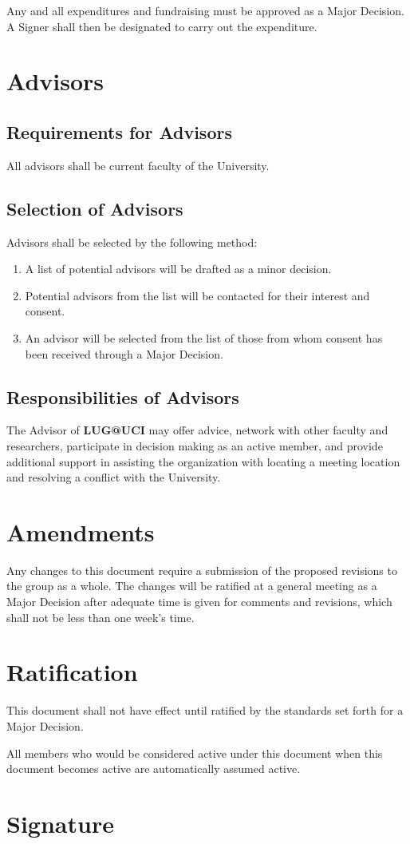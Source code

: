 \documentclass{article}
\begin{document}
Any and all expenditures and fundraising must be approved as a Major Decision. A 
Signer shall then be designated to carry out the expenditure.

\section{Advisors}

\subsection{Requirements for Advisors}

All advisors shall be current faculty of the University.

\subsection{Selection of Advisors}

Advisors shall be selected by the following method:

\begin{enumerate}

    \item A list of potential advisors will be drafted as a minor decision.
    \item Potential advisors from the list will be contacted for their
        interest and consent.
    \item An advisor will be selected from the list of those from whom
        consent has been received through a Major Decision.

\end{enumerate}

\subsection{Responsibilities of Advisors}

The Advisor of \textbf{LUG@UCI} may offer advice, network with other faculty and
researchers, participate in decision making as an active member, and provide
additional support in assisting the organization with locating a meeting location
and resolving a conflict with the University.

\section{Amendments}

Any changes to this document require a submission of the proposed revisions to the
group as a whole. The changes will be ratified at a general meeting as a Major Decision
after adequate time is given for comments and revisions, which shall not be less than one
week's time.

\section{Ratification}

This document shall not have effect until ratified by the standards set forth for
a Major Decision.

All members who would be considered active under this document when this document
becomes active are automatically assumed active.

\section{Signature}
\end{document}
